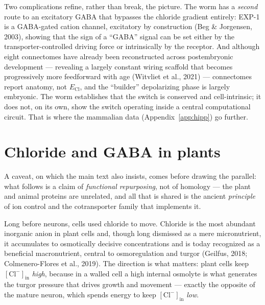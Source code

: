 \documentclass[11pt,a4paper]{article}
\newcommand{\Clm}{\mathrm{Cl}^{-}}
\newcommand{\ECl}{E_{\mathrm{Cl}}}
\begin{document}
Two complications refine, rather than break, the picture. The worm has a \emph{second} route to an excitatory GABA that bypasses the chloride gradient entirely: EXP-1 is a GABA-gated cation channel, excitatory by construction (Beg \& Jorgensen, 2003), showing that the sign of a ``GABA'' signal can be set either by the transporter-controlled driving force or intrinsically by the receptor. And although eight connectomes have already been reconstructed across postembryonic development --- revealing a largely constant wiring scaffold that becomes progressively more feedforward with age (Witvliet et al., 2021) --- connectomes report anatomy, not $\ECl$, and the ``builder'' depolarizing phase is largely embryonic. The worm establishes that the switch is conserved and cell-intrinsic; it does not, on its own, show the switch operating inside a central computational circuit. That is where the mammalian data (Appendix~\ref{app:hipp}) go further.

\FloatBarrier
\section{Chloride and GABA in plants}\label{app:plants}
A caveat, on which the main text also insists, comes before drawing the parallel: what follows is a claim of \emph{functional repurposing}, not of homology --- the plant and animal proteins are unrelated, and all that is shared is the ancient \emph{principle} of ion control and the cotransporter family that implements it.

Long before neurons, cells used chloride to move. Chloride is the most abundant inorganic anion in plant cells and, though long dismissed as a mere micronutrient, it accumulates to osmotically decisive concentrations and is today recognized as a beneficial macronutrient, central to osmoregulation and turgor (Geilfus, 2018; Colmenero-Flores et al., 2019). The direction is what matters: plant cells keep $[\Clm]_{\mathrm{in}}$ \emph{high}, because in a walled cell a high internal osmolyte is what generates the turgor pressure that drives growth and movement --- exactly the opposite of the mature neuron, which spends energy to keep $[\Clm]_{\mathrm{in}}$ \emph{low}.
\end{document}
